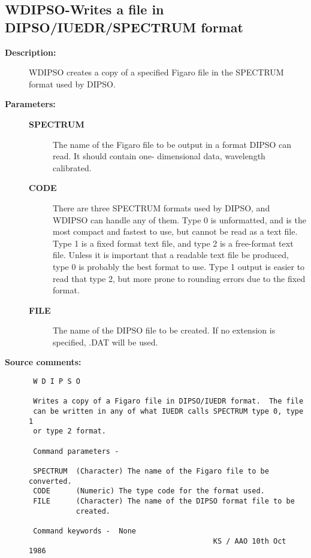 \subsection{WDIPSO-\label{WDIPSO}Writes a file in DIPSO/IUEDR/SPECTRUM format}
\begin{description}

\item [{\bf Description:}]
 WDIPSO creates a copy of a specified Figaro file in the SPECTRUM
 format used by DIPSO.

\item [{\bf Parameters:}]
\begin{description}
\item [{\bf SPECTRUM}]
 The name of the Figaro file to be output
 in a format DIPSO can read.  It should contain one-
 dimensional data, wavelength calibrated.
\item [{\bf CODE}]
 There are three SPECTRUM formats used by DIPSO, and
 WDIPSO can handle any of them.  Type 0 is unformatted,
 and is the most compact and fastest to use, but cannot
 be read as a text file.  Type 1 is a fixed format text
 file, and type 2 is a free-format text file.  Unless it
 is important that a readable text file be produced, type
 0 is probably the best format to use.  Type 1 output is
 easier to read that type 2, but more prone to rounding
 errors due to the fixed format.
\item [{\bf FILE}]
 The name of the DIPSO file to be created.
 If no extension is specified, .DAT will be used.
\end{description}

\item [{\bf Source comments:}]
\begin{verbatim}
 W D I P S O

 Writes a copy of a Figaro file in DIPSO/IUEDR format.  The file
 can be written in any of what IUEDR calls SPECTRUM type 0, type 1
 or type 2 format.

 Command parameters -

 SPECTRUM  (Character) The name of the Figaro file to be converted.
 CODE      (Numeric) The type code for the format used.
 FILE      (Character) The name of the DIPSO format file to be
           created.

 Command keywords -  None
                                           KS / AAO 10th Oct 1986
\end{verbatim}
\end{description}
